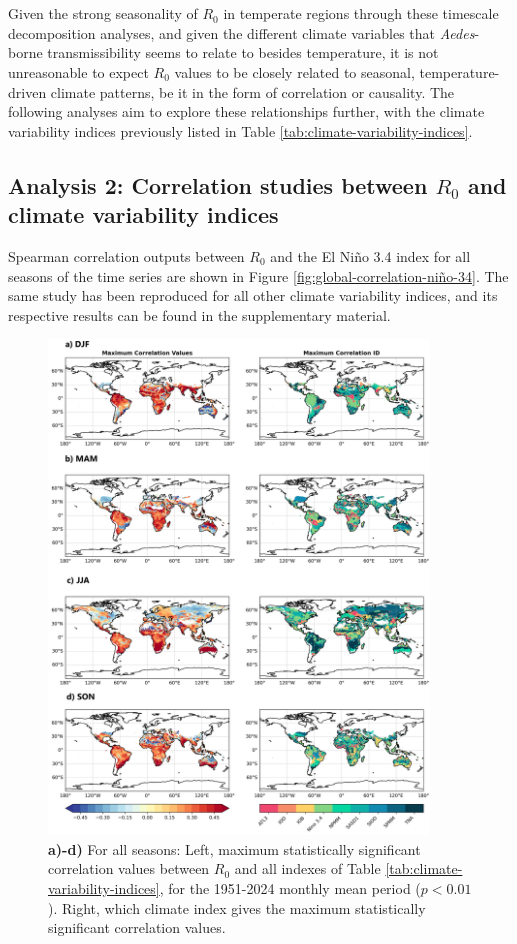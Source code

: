 \documentclass[10pt,twocolumn]{wlscirep}
\begin{document}
\\
\\
Given the strong seasonality of $R_0$ in temperate regions through these timescale decomposition analyses, and given the different climate variables that \textit{Aedes}-borne transmissibility seems to relate to besides temperature, it is not unreasonable to expect $R_0$ values to be closely related to seasonal, temperature-driven climate patterns, be it in the form of correlation or causality. The following analyses aim to explore these relationships further, with the climate variability indices previously listed in Table \ref{tab:climate-variability-indices}.

\subsection{Analysis 2: Correlation studies between $R_0$ and climate variability indices} \label{sec-results-2} \label{sec-results-2}

Spearman correlation outputs between $R_0$ and the El Niño 3.4 index for all seasons of the time series are shown in Figure \ref{fig:global-correlation-niño-34}. The same study has been reproduced for all other climate variability indices, and its respective results can be found in the supplementary material.
\\
\begin{figure}[!ht]
  \centering
  \includegraphics[width=0.9\textwidth]{correlation_final_global_ps.png}
  \caption{\textbf{a)-d)} For all seasons: Left, maximum statistically significant correlation values between $R_0$ and all indexes of Table \ref{tab:climate-variability-indices}, for the 1951-2024 monthly mean period ($p < 0.01$). Right, which climate index gives the maximum statistically significant correlation values.}
  \label{fig:global-correlation-final}
\end{figure}
\end{document}

